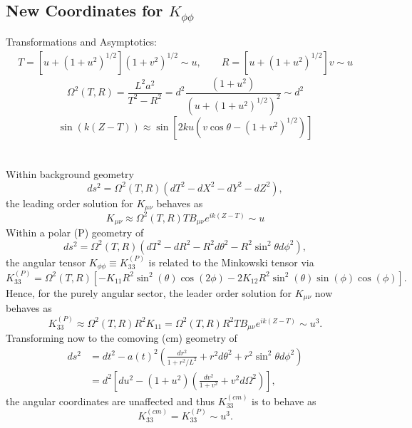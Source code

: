 \documentclass[10pt,letterpaper]{article}
\begin{document}
\subsection*{New Coordinates for $K_{\phi\phi}$}
Transformations and Asymptotics:
\begin{align}
T = \left[u+(1+u^2)^{1/2}\right]( 1+v^2)^{1/2}\sim u,\qquad R = \left[u+(1+u^2)^{1/2}\right]v\sim u
\end{align}
\begin{equation}
\Omega^2(T,R) = \frac{L^2 a^2}{T^2-R^2} = d^2\frac{(1+u^2)}{(u+(1+u^2)^{1/2})^2}\sim d^2
\end{equation}
\begin{equation}
\sin(k(Z-T)) \approx \sin\left[ 2 k u \left( v\cos\theta - (1+v^2)^{1/2}\right)\right]
\end{equation}
\\ \\
Within background geometry
\begin{equation}
ds^2 = \Omega^2(T,R)(dT^2 - dX^2-dY^2 -dZ^2),
\end{equation}
the leading order solution for $K_{\mu\nu}$ behaves as
\begin{equation} 
K_{\mu\nu} \approx \Omega^2(T,R) T B_{\mu\nu} e^{ik(Z-T)} \sim u
\end{equation}
Within a polar (P) geometry of 
\begin{equation}
ds^2 = \Omega^2(T,R)(dT^2 - dR^2 - R^2 d\theta^2-R^2\sin^2\theta d\phi^2),
\end{equation}
the angular tensor $K_{\phi\phi} \equiv K^{(P)}_{33}$ is related to the Minkowski tensor via
\begin{equation}
K^{(P)}_{33} = \Omega^2(T,R)\left[-K_{11}R^2 \sin ^2(\theta ) \cos (2 \phi )-2 K_{12} R^2 \sin ^2(\theta ) \sin (\phi ) \cos (\phi )\right].
\end{equation}
Hence, for the purely angular sector, the leader order solution for $K_{\mu\nu}$ now behaves as
\begin{equation} 
K^{(P)}_{33} \approx \Omega^2(T,R) R^2 K_{11} = \Omega^2(T,R) R^2 T B_{\mu\nu} e^{ik(Z-T)} \sim u^3.
\end{equation}
Transforming now to the comoving (cm) geometry of 
\begin{align}
ds^2 &=  dt^2 - a(t)^2 \left(  \frac{dr^2}{1+r^2/L^2} + r^2 d\theta^2 + r^2\sin^2\theta d\phi^2 \right)\nonumber\\
&= d^2 \left[ du^2 - (1+u^2)\left( \frac{dv^2}{1+v^2} + v^2 d\Omega^2\right)\right] ,
\end{align}
the angular coordinates are unaffected and thus $K_{33}^{(cm)}$ is to behave as
\begin{equation} 
\boxed{
K^{(cm)}_{33} = K^{(P)}_{33} \sim u^3}.
\end{equation}
\end{document}
